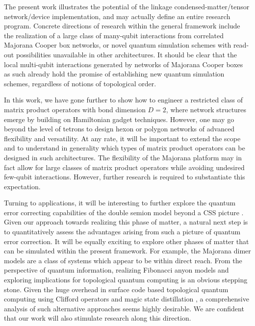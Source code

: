 \documentclass[twocolumn,floats,prx,showpacs]{revtex4-1}
\newcommand{\rein}[1]{{\color{rein} #1}}
\begin{document}
The present work illustrates the potential of the linkage condensed-matter/tensor network/device implementation, and may actually define an
entire research program. Concrete  directions of research within the general framework include the realization of a   large class of many-qubit interactions from correlated Majorana Cooper box networks, or novel quantum simulation schemes \cite{CiracZollerSimulation,Roadmap} with read-out possibilities \cite{Plugge2017,Karzig2017} unavailable in other architectures.  It should be clear that the local multi-qubit interactions generated by  networks of Majorana Cooper boxes as such already hold the promise of establishing new quantum simulation schemes, regardless of
notions of topological order.

In this work, we have gone further to show how to engineer a restricted class of matrix product operators with bond dimension $D=2$, where network structures emerge by building on Hamiltonian gadget techniques. However, one may go beyond the level of tetrons to design hexon or polygon networks of advanced flexibility and versatility.  At any rate, it will be important to extend the scope and to understand in generality  which types of matrix product operators can be designed in such architectures. The flexibility of the Majorana platform may in fact allow for large classes of matrix product operators while  avoiding undesired few-qubit interactions.  However, further research is required to substantiate this expectation. 

\rein{Turning to applications, it will be interesting to further explore the quantum error correcting capabilities of the double semion model
beyond a CSS picture \cite{SemionErrorCorrection}. Given our approach towards realizing this phase of matter,
a natural next step is to quantitatively assess the advantages arising from such a picture of quantum error correction. 
It will be equally exciting}  to explore other phases of matter that can be simulated within the 
present framework. For example, the Majorana dimer models \cite{PhysRevB.94.115115,PhysRevB.94.115127} are a class of systems which appear to be within direct reach.
From the perspective of quantum information, realizing
Fibonacci anyon models \cite{Levin2005}  and exploring  implications 
for topological quantum computing is an obvious stepping stone. Given the huge overhead in surface code based topological quantum computing using Clifford operators and magic state distillation \cite{PhysRevA.71.022316}, 
a comprehensive analysis of such alternative approaches seems highly desirable. 
We are confident that our work will also stimulate research along this direction.
\end{document}

